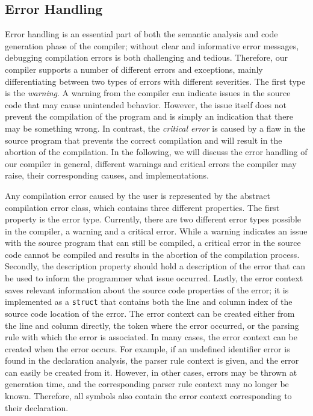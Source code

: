 \subsection{Error Handling}
\label{sec:implementation_compiler_errorHandling}
Error handling is an essential part of both the semantic analysis and code generation phase of the compiler; without clear and informative error messages, debugging compilation errors is both challenging and tedious. 
Therefore, our compiler supports a number of different errors and exceptions, mainly differentiating between two types of errors with different severities. The first type is the \emph{warning}. A warning from the compiler can indicate issues in the source code that may cause unintended behavior. However, the issue itself does not prevent the compilation of the program and is simply an indication that there may be something wrong. In contrast, the \emph{critical error} is caused by a flaw in the source program that prevents the correct compilation and will result in the abortion of the compilation. In the following, we will discuss the error handling of our compiler in general, different warnings and critical errors the compiler may raise, their corresponding causes, and implementations.

Any compilation error caused by the user is represented by the abstract compilation error class, which contains three different properties. The first property is the error type. Currently, there are two different error types possible in the compiler, a warning and a critical error. While a warning indicates an issue with the source program that can still be compiled, a critical error in the source code cannot be compiled and results in the abortion of the compilation process. Secondly, the description property should hold a description of the error that can be used to inform the programmer what issue occurred. Lastly, the error context saves relevant information about the source code properties of the error; it is implemented as a \texttt{struct} that contains both the line and column index of the source code location of the error. The error context can be created either from the line and column directly, the token where the error occurred, or the parsing rule with which the error is associated. In many cases, the error context can be created when the error occurs. For example, if an undefined identifier error is found in the declaration analysis, the parser rule context is given, and the error can easily be created from it. However, in other cases, errors may be thrown at generation time, and the corresponding parser rule context may no longer be known. Therefore, all symbols also contain the error context corresponding to their declaration.

